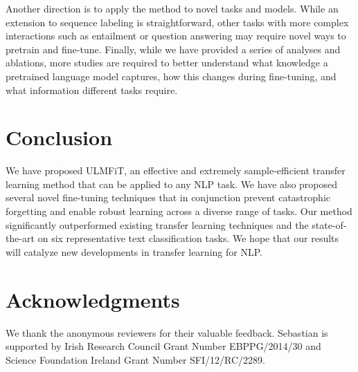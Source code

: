 \documentclass[11pt,a4paper]{article}
\begin{document}
Another direction is to apply the method to novel tasks and models. While an extension to sequence labeling is straightforward, other tasks with more complex interactions such as entailment or question answering may require novel ways to pretrain and fine-tune. Finally, while we have provided a series of analyses and ablations, more studies are required to better understand what knowledge a pretrained language model captures, how this changes during fine-tuning, and what information different tasks require.

\section{Conclusion}

We have proposed ULMFiT, an effective and extremely sample-efficient transfer learning method that can be applied to any NLP task. We have also proposed several novel fine-tuning techniques that in conjunction prevent catastrophic forgetting and enable robust learning across a diverse range of tasks. Our method significantly outperformed existing transfer learning techniques and the state-of-the-art on six representative text classification tasks. We hope that our results will catalyze new developments in transfer learning for NLP.

\section*{Acknowledgments}

We thank the anonymous reviewers for their valuable feedback. Sebastian is supported by Irish Research Council Grant Number EBPPG/2014/30 and Science Foundation Ireland Grant Number SFI/12/RC/2289.



\end{document}
